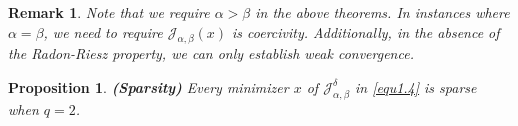 \documentclass[a4paper,12pt]{article}
\newtheorem{proposition}[theorem]{Proposition}
\newtheorem{remark}[theorem]{Remark}
\numberwithin{equation}{section}
\begin{document}

\begin{remark}   
    Note that we require $\alpha>\beta$ in the above theorems. In instances where $\alpha=\beta$, we need to require $\mathcal{J}_{\alpha,\beta}\left(x\right)$ is coercivity. Additionally, in the absence of the Radon-Riesz property, we can only establish weak convergence.
\end{remark}

\begin{proposition}\label{pro2.13}
    \textbf{(Sparsity)} Every minimizer $x$ of $\mathcal{J}_{\alpha,\beta}^{\delta}$ in \eqref{equ1.4} is sparse when $q=2$.
\end{proposition}
\end{document}

